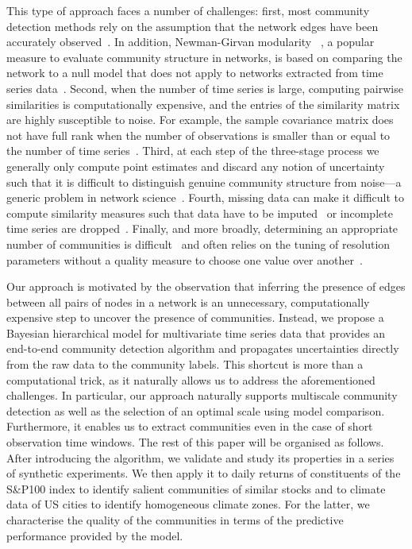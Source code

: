 \documentclass[onecolumn,pre,superscriptaddress, longbibliography, nofootinbib, notitlepage]{revtex4-1}
\begin{document}
This type of approach faces a number of challenges: first, most community detection methods rely on the assumption that the network edges have been accurately observed~\cite{Fortunato2010}. In addition, Newman-Girvan modularity ~\cite{Newman2004}, a popular measure to evaluate community structure in networks, is based on comparing the network to a null model that does not apply to networks extracted from time series data~\cite{MacMahon2015}. Second, when the number of time series is large, computing pairwise similarities is computationally expensive, and the entries of the similarity matrix are highly susceptible to noise. For example, the sample covariance matrix does not have full rank when the number of observations is smaller than or equal to the number of time series~\cite{Cai2011}. Third, at each step of the three-stage process we generally only compute point estimates and discard any notion of uncertainty such that it is difficult to distinguish genuine community structure from noise---a generic problem in network science~\cite{Newman2017}. Fourth, missing data can make it difficult to compute similarity measures such that data have to be imputed~\cite{Wu2015} or incomplete time series are dropped~\cite{MacMahon2015, Bazzi2016}. Finally, and more broadly, determining an appropriate number of communities is difficult~\cite{Latouche2012} and often relies on the tuning of resolution parameters without a quality measure to choose one value over another~\cite{Reichardt2006, Fenn2012}.

Our approach is motivated by the observation that inferring the presence of edges between all pairs of nodes in a network is an unnecessary, computationally expensive step to uncover the presence of communities. Instead, we propose a Bayesian hierarchical model for multivariate time series data that provides an end-to-end community detection algorithm and propagates uncertainties directly from the raw data to the community labels. This shortcut is more than a computational trick, as it naturally allows us to address the aforementioned challenges. In particular, our approach naturally supports multiscale community detection as well as the selection of an optimal scale using model comparison. Furthermore, it enables us to extract communities even in the case of short observation time windows. The rest of this paper will be organised as follows. After introducing the algorithm, we validate and study its properties in a series of synthetic experiments. We then apply it to daily returns of constituents of the S\&P100 index to identify salient communities of similar stocks and to climate data of US cities to identify homogeneous climate zones. For the latter, we characterise the quality of the communities in terms of the predictive performance provided by the model.
\end{document}

